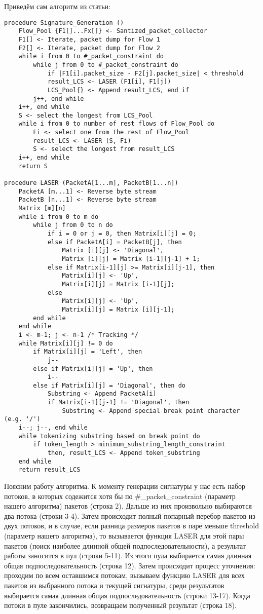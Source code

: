 Приведём сам алгоритм из статьи:

\begin{lstlisting}[language=PL/I]
procedure Signature_Generation ()
    Flow_Pool {F1[]...Fx[]} <- Santized_packet_collector
    F1[] <- Iterate, packet dump for Flow 1
    F2[] <- Iterate, packet dump for Flow 2
    while i from 0 to #_packet_constraint do
        while j from 0 to #_packet_constraint do
            if |F1[i].packet_size - F2[j].packet_size| < threshold
            result_LCS <- LASER (F1[i], F1[j])
            LCS_Pool{} <- Append result_LCS, end if
        j++, end while
    i++, end while
    S <- select the longest from LCS_Pool
    while i from 0 to number of rest flows of Flow_Pool do
        Fi <- select one from the rest of Flow_Pool
        result_LCS <- LASER (S, Fi)
        S <- select the longest from result_LCS
    i++, end while
    return S

procedure LASER (PacketA[1...m], PacketB[1...n])
    PacketA [m...1] <- Reverse byte stream
    PacketB [n...1] <- Reverse byte stream
    Matrix [m][n]
    while i from 0 to m do
        while j from 0 to n do
            if i = 0 or j = 0, then Matrix[i][j] = 0;
            else if PacketA[i] = PacketB[j], then
                Matrix [i][j] <- 'Diagonal',
                Matrix [i][j] = Matrix [i-1][j-1] + 1;
            else if Matrix[i-1][j] >= Matrix[i][j-1], then
                Matrix[i][j] <- 'Up',
                Matrix[i][j] = Matrix [i-1][j];
            else
                Matrix[i][j] <- 'Up',
                Matrix[i][j] = Matrix [i][j-1];
        end while
    end while
    i <- m-1; j <- n-1 /* Tracking */
    while Matrix[i][j] != 0 do
        if Matrix[i][j] = 'Left', then
            j--
        else if Matrix[i][j] = 'Up', then
            i--
        else if Matrix[i][j] = 'Diagonal', then do
            Substring <- Append PacketA[i]
            if Matrix[i-1][j-1] != 'Diagonal', then
                Substring <- Append special break point character (e.g. '/')
    i--; j--, end while
    while tokenizing substring based on break point do
        if token_length > minimum_substring_length_constraint
            then, result_LCS <- Append token_substring
    end while
    return result_LCS
\end{lstlisting}

Поясним работу алгоритма. К моменту генерации сигнатуры у нас есть набор потоков,
в которых содежится хотя бы по \#\_packet\_constraint (параметр нашего алгоритма) пакетов (строка 2).
Дальше из них произвольно выбираются два потока (строки 3-4). Затем происходит полный попарный перебор пакетов из двух потоков,
и в случае, если разница размеров пакетов в паре меньше threshold (параметр нашего алгоритма),
то вызывается функция LASER для этой пары пакетов (поиск наиболее длинной общей подпоследовательности),
а результат работы заносится в пул (строки 5-11).
Из этого пула выбирается самая длинная общая подпоследовательность (строка 12).
Затем происходит процесс уточнения: проходим по всем оставшимся потокам, вызываем функцию LASER для всех пакетов из выбранного потока и текущей сигнатуры,
среди результатов выбирается самая длинная общая подпоследовательность (строки 13-17). Когда потоки в пуле закончились, возвращаем полученный результат (строка 18).

